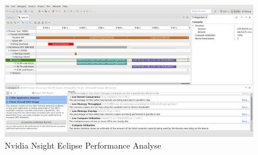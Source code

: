                     \begin{figure}[h]
			            \centering
			            \includegraphics[width=\textwidth]{chapter3/pictures/NEact.png}
			            \caption{Nvidia Nsight Eclipse Performance Analyse}
			            \label{fig3:neact}
			        \end{figure}
			        \FloatBarrier
